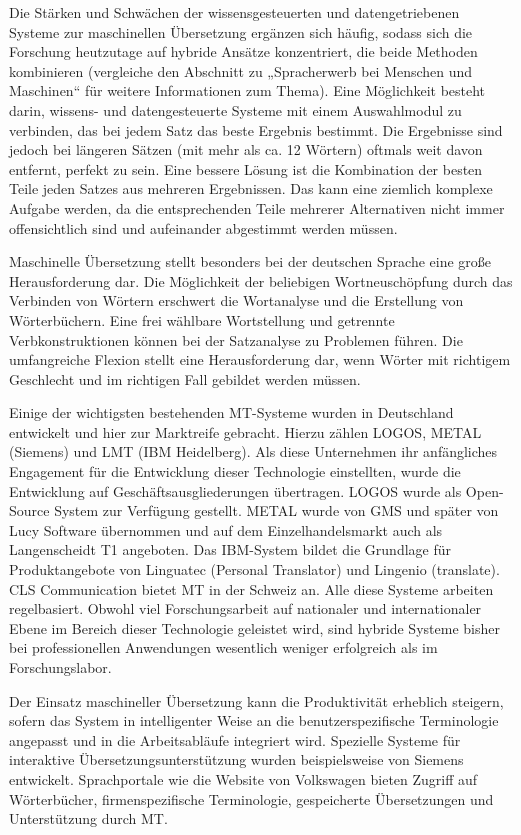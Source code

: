 \documentclass[]{../../metanetpaper}
\begin{document}
\begin{Parallel}[c]{79mm}{78mm}
{Die Stärken und Schwächen der wissensgesteuerten und datengetriebenen Systeme zur maschinellen Übersetzung ergänzen sich häufig, sodass sich die Forschung heutzutage auf hybride Ansätze konzentriert, die beide Methoden kombinieren (vergleiche den Abschnitt zu „Spracherwerb bei Menschen und Maschinen“ für weitere Informationen zum Thema). Eine Möglichkeit besteht darin, wissens- und datengesteuerte Systeme mit einem Auswahlmodul zu verbinden, das bei jedem Satz das beste Ergebnis bestimmt. Die Ergebnisse sind jedoch bei längeren Sätzen (mit mehr als ca. 12 Wörtern) oftmals weit davon entfernt, perfekt zu sein. Eine bessere Lösung ist die Kombination der besten Teile jeden Satzes aus mehreren Ergebnissen. Das kann eine ziemlich komplexe Aufgabe werden, da die entsprechenden Teile mehrerer Alternativen nicht immer offensichtlich sind und aufeinander abgestimmt werden müssen. 

Maschinelle Übersetzung stellt besonders bei der deutschen Sprache eine große Herausforderung dar.  Die Möglichkeit der beliebigen Wortneuschöpfung durch das Verbinden von Wörtern erschwert die Wortanalyse und die Erstellung von Wörterbüchern. Eine frei wählbare Wortstellung und getrennte Verbkonstruktionen können bei der Satzanalyse zu Problemen führen. Die umfangreiche Flexion stellt eine Herausforderung dar, wenn Wörter mit richtigem Geschlecht und im richtigen Fall gebildet werden müssen. 

Einige der wichtigsten bestehenden MT-Systeme wurden in Deutschland entwickelt und hier zur Marktreife gebracht. Hierzu zählen LOGOS, METAL (Siemens) und LMT (IBM Heidelberg). Als diese Unternehmen ihr anfängliches Engagement für die Entwicklung dieser Technologie einstellten, wurde die Entwicklung auf Geschäftsausgliederungen übertragen. LOGOS wurde als Open-Source System zur Verfügung gestellt. METAL wurde von GMS und später von Lucy Software übernommen und auf dem Einzelhandelsmarkt auch als Langenscheidt T1 angeboten. Das IBM-System bildet die Grundlage für Produktangebote von Linguatec (Personal Translator) und Lingenio (translate). CLS Communication bietet MT in der Schweiz an. Alle diese Systeme arbeiten regelbasiert. Obwohl viel Forschungsarbeit auf nationaler und internationaler Ebene im Bereich dieser Technologie geleistet wird, sind hybride Systeme bisher bei professionellen Anwendungen wesentlich weniger erfolgreich als im Forschungslabor. 

Der Einsatz maschineller Übersetzung kann die Produktivität erheblich steigern, sofern das System in intelligenter Weise an die benutzerspezifische Terminologie angepasst und in die Arbeitsabläufe integriert wird. Spezielle Systeme für interaktive Übersetzungsunterstützung wurden beispielsweise von Siemens entwickelt. Sprachportale wie die Website von Volkswagen bieten Zugriff auf Wörterbücher, firmenspezifische Terminologie, gespeicherte Übersetzungen und Unterstützung durch MT. 

}
\end{Parallel}
\end{document}
